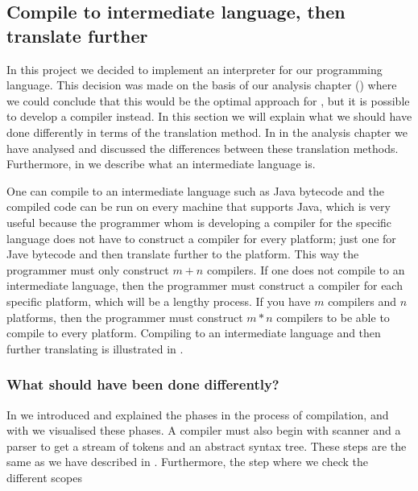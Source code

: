 \subsection{Compile to intermediate language, then translate further}
\label{sec:compiletointermediate}

In this project we decided to implement an interpreter for our programming
language. This decision was made on the basis of our analysis chapter
() where we could conclude that this would be the optimal
approach for \productname{}, but it is possible to develop a compiler instead. In
this section we will explain what we should have done differently in terms of
the translation method. In  in the
analysis chapter we have analysed and discussed the differences between these
translation methods. Furthermore, in  we
describe what an intermediate language is.

One can compile to an intermediate language such as Java bytecode and the
compiled code can be run on every machine that supports Java, which is very
useful because the programmer whom is developing a compiler for the specific
language does not have to construct a compiler for every platform; just one for
Jave bytecode and then translate further to the platform. This way the
programmer must only construct $m+n$ compilers. If one does not compile to an
intermediate language, then the programmer must construct a compiler for each
specific platform, which will be a lengthy process. If you have $m$ compilers
and $n$ platforms, then the programmer must construct $m*n$ compilers to be able
to compile to every platform.  Compiling to an intermediate language and then
further translating is illustrated in .



\subsubsection{What should have been done differently?}

In  we introduced and explained the phases in the
process of compilation, and with  we visualised
these phases. A compiler must also begin with scanner and a parser to get a
stream of tokens and an abstract syntax tree. These steps are the same as we
have described in . Furthermore, the step where we
check the different scopes
